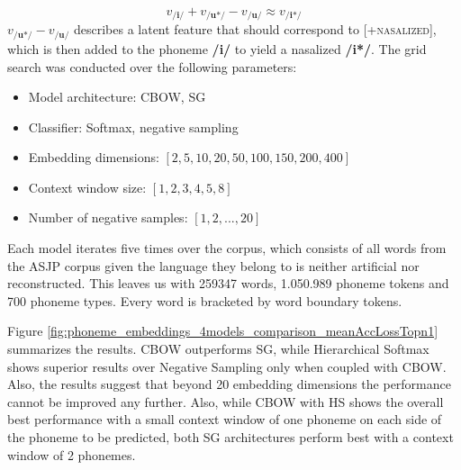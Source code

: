 \documentclass[6pt]{article}
\begin{document}
\begin{equation}
v_{\textbf{/i/} } + v_{\textbf{/u*/} } -  v_{\textbf{/u/} } \approx v_{\textbf{/i*/} }
\end{equation}
$v_{\textbf{/u*/} } -  v_{\textbf{/u/} }$ describes a latent feature that should correspond to \textsc{[+nasalized]}, which is then added to the phoneme \textbf{/i/} to yield a nasalized \textbf{/i*/}.
The grid search was conducted over the following parameters:
\begin{itemize}
\item Model architecture: CBOW, SG
\item Classifier: Softmax, negative sampling
\item Embedding dimensions: $[2, 5,10, 20, 50, 100, 150, 200, 400 ]$
\item Context window size: $[1,2,3,4,5,8]$
\item Number of negative samples: $[1,2, ..., 20]$
\end{itemize}
 Each model iterates five times over the corpus, which consists of all words from the ASJP corpus given the language they belong to is neither artificial nor reconstructed. This leaves us with 259347 words, 1.050.989 phoneme tokens and 700 phoneme types. Every word is bracketed by word boundary tokens.

Figure \ref{fig:phoneme_embeddings_4models_comparison_meanAccLossTopn1} summarizes the results.  CBOW outperforms SG, while Hierarchical Softmax shows superior results over Negative Sampling only when coupled with CBOW. Also, the results suggest  that beyond 20 embedding dimensions the performance cannot be improved any further.  Also, while CBOW with HS shows the overall best performance with a small context window of one phoneme on each side of the phoneme to be predicted, both SG architectures perform best with a context window of 2 phonemes.
\end{document}
